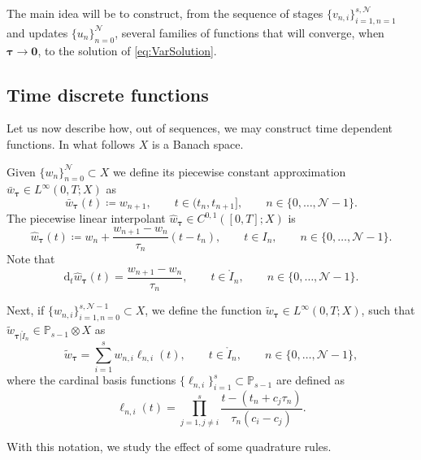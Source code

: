 \documentclass{amsart}
\newcommand{\bftau}{{\boldsymbol{\tau}}}
\newcommand{\mclN}{\mathcal{N}}
\newcommand{\bfzero}{\mathbf{0}}
\newcommand{\mbbP}{\mathbb{P}}
\theoremstyle{definition}
\newcommand{\diff}{\mathrm{d}}
\begin{document}
The main idea will be to construct, from the sequence of stages $\{v_{n,i}\}_{i=1,n=1}^{s,\mclN}$ and updates $\{u_n\}_{n=0}^\mclN$, several families of functions that will converge, when $\bftau \to \bfzero$, to the solution of \eqref{eq:VarSolution}. 

\subsection{Time discrete functions}

Let us now describe how, out of sequences, we may construct time dependent functions. In what follows $X$ is a Banach space.

Given $\{w_n\}_{n=0}^\mclN \subset X$ we define its piecewise constant approximation $\bar{w}_\bftau \in L^\infty(0,T;X)$ as
\[
  \bar{w}_\bftau(t) \coloneqq w_{n+1}, \qquad t \in (t_n, t_{n+1}], \qquad n \in \{0, \ldots, \mclN-1\}.
\]
The piecewise linear interpolant $\hat{w}_\bftau \in C^{0,1}([0,T];X)$ is
\[
  \hat{w}_\bftau(t) \coloneqq w_n + \frac{ w_{n+1} - w_n }{\tau_n} \left( t -t_n \right), \qquad t \in I_n, \qquad n \in \{0, \ldots, \mclN-1\}.
\]
Note that
\[
  \diff_t \hat{w}_\bftau(t) = \frac{ w_{n+1} - w_n }{\tau_n}, \qquad t \in \mathring{I}_n, \qquad n \in \{0, \ldots, \mclN-1\}.
\]

Next, if $\{w_{n,i} \}_{i=1,n=0}^{s,\mclN-1} \subset X$, we define the function $\tilde{w}_\bftau \in L^\infty(0,T;X)$, such that $\tilde{w}_{\bftau|\mathring{I}_n} \in \mbbP_{s-1} \otimes X$ as
\[
  \tilde{w}_\bftau = \sum_{i=1}^s w_{n,i} \ell_{n,i}(t), \qquad t \in \mathring{I}_n, \qquad n \in \{0, \ldots, \mclN-1\},
\]
where the cardinal basis functions $\{\ell_{n,i} \}_{i=1}^s \subset \mbbP_{s-1}$ are defined as
\[
  \ell_{n,i}(t) = \prod_{j=1,j\neq i}^s \frac{ t-(t_n + c_j \tau_n) }{\tau_n(c_i-c_j)}.
\]

With this notation, we study the effect of some quadrature rules.
\end{document}
